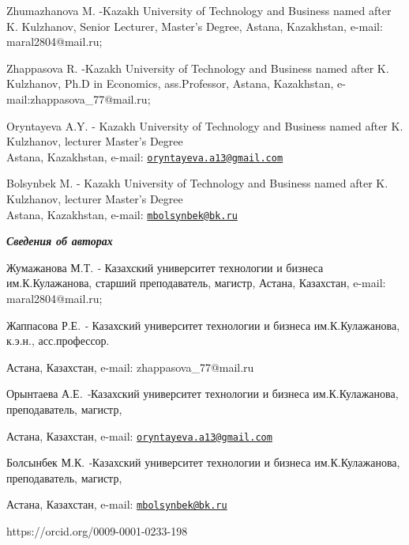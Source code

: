 Zhumazhanova M. -Kazakh University of Technology and Business named
after K. Kulzhanov, Senior Lecturer, Master's Degree, Astana,
Kazakhstan, e-mail: maral2804@mail.ru;

Zhappasova R. -Kazakh University of Technology and Business named after
K. Kulzhanov, Ph.D in Economics, ass.Professor, Astana, Kazakhstan,
e-mail:zhappasova\_77@mail.ru;

Oryntayeva A.Y. - Kazakh University of Technology and Business named
after K. Kulzhanov, lecturer Master's Degree\\
Astana, Kazakhstan, e-mail:
\href{mailto:oryntayeva.a13@gmail.com}{\nolinkurl{oryntayeva.a13@gmail.com}}

Bolsynbek M. - Kazakh University of Technology and Business named after
K. Kulzhanov, lecturer Master's Degree\\
Astana, Kazakhstan, e-mail:
\href{mailto:mbolsynbek@bk.ru}{\nolinkurl{mbolsynbek@bk.ru}}

\emph{{\bfseries Сведения об авторах}}

Жумажанова М.Т. \emph{-} Казахский университет технологии и бизнеса
им.К.Кулажанова, старший преподаватель, магистр, Астана, Казахстан,
e-mail: maral2804@mail.ru;

Жаппасова Р.Е. \emph{-} Казахский университет технологии и бизнеса
им.К.Кулажанова, к.э.н., асс.профессор.

Астана, Казахстан, e-mail: zhappasova\_77@mail.ru

Орынтаева А.Е\emph{. -}Казахский университет технологии и бизнеса
им.К.Кулажанова, преподаватель, магистр,

Астана, Казахстан, e-mail:
\href{mailto:oryntayeva.a13@gmail.com}{\nolinkurl{oryntayeva.a13@gmail.com}}

Болсынбек М.К. \emph{-}Казахский университет технологии и бизнеса
им.К.Кулажанова, преподаватель, магистр,

Астана, Казахстан, e-mail:
\href{mailto:mbolsynbek@bk.ru}{\nolinkurl{mbolsynbek@bk.ru}}

https://orcid.org/0009-0001-0233-198
